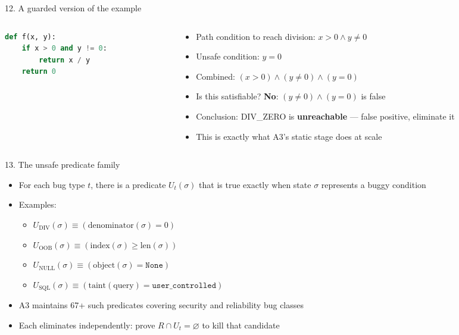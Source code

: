 \documentclass[aspectratio=169]{beamer}
\begin{document}
\begin{frame}[fragile]{12. A guarded version of the example}
\begin{columns}
\begin{column}{0.45\textwidth}
\begin{lstlisting}[language=Python]
def f(x, y):
    if x > 0 and y != 0:
        return x / y
    return 0
\end{lstlisting}
\end{column}
\begin{column}{0.52\textwidth}
\begin{itemize}
  \item Path condition to reach division: \(x > 0 \wedge y \ne 0\)
  \item Unsafe condition: \(y = 0\)
  \item Combined: \((x > 0) \wedge (y \ne 0) \wedge (y = 0)\)
  \item Is this satisfiable? \textbf{No}: \((y \ne 0) \wedge (y = 0)\) is false
  \item Conclusion: DIV\_ZERO is \textbf{unreachable} --- false positive, eliminate it
  \item This is exactly what A3's static stage does at scale
\end{itemize}
\end{column}
\end{columns}
\end{frame}

\begin{frame}{13. The unsafe predicate family}
\begin{itemize}
  \item For each bug type \(t\), there is a predicate \(U_t(\sigma)\) that is true exactly when state \(\sigma\) represents a buggy condition
  \item Examples:
  \begin{itemize}
    \item \(U_{\text{DIV}}(\sigma) \equiv (\text{denominator}(\sigma) = 0)\)
    \item \(U_{\text{OOB}}(\sigma) \equiv (\text{index}(\sigma) \ge \text{len}(\sigma))\)
    \item \(U_{\text{NULL}}(\sigma) \equiv (\text{object}(\sigma) = \texttt{None})\)
    \item \(U_{\text{SQL}}(\sigma) \equiv (\text{taint}(\text{query}) = \texttt{user\_controlled})\)
  \end{itemize}
  \item A3 maintains 67+ such predicates covering security and reliability bug classes
  \item Each eliminates independently: prove \(R \cap U_t = \varnothing\) to kill that candidate
\end{itemize}
\end{frame}
\end{document}
